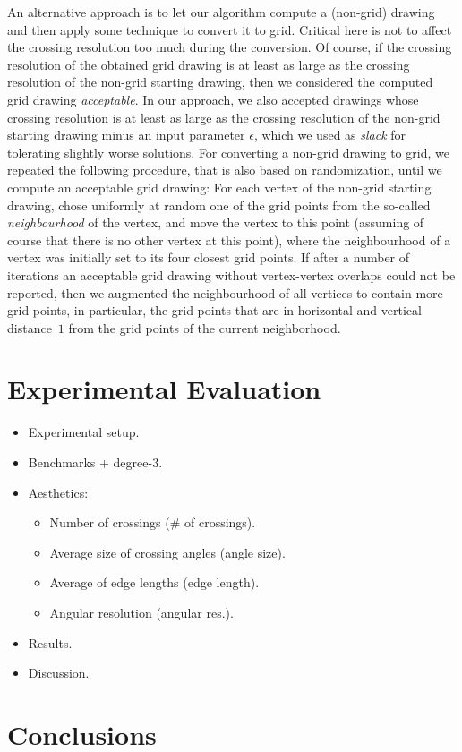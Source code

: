 \documentclass[runningheads]{llncs}
\begin{document}
An alternative approach is to let our algorithm compute a (non-grid) drawing and then apply some technique to convert it to grid. Critical here is not to affect the crossing resolution too much during the conversion. Of course, if the crossing resolution of the obtained grid drawing is at least as large as the crossing resolution of the non-grid starting drawing, then we considered the computed grid drawing \emph{acceptable}. In our approach, we also accepted drawings whose crossing resolution is at least as large as the crossing resolution of the non-grid starting drawing minus an input parameter $\epsilon$, which we used as \emph{slack} for tolerating slightly worse solutions. For converting a non-grid drawing to grid, we repeated the following procedure, that is also based on randomization, until we compute an acceptable grid drawing: For each vertex of the non-grid starting drawing, chose uniformly at random one of the grid points from the so-called \emph{neighbourhood} of the vertex, and move the vertex to this point (assuming of course that there is no other vertex at this point), where the neighbourhood of a vertex was initially set to its four closest grid points. If after a number of iterations an acceptable grid drawing without vertex-vertex overlaps could not be reported, then we augmented the neighbourhood of all vertices to contain more grid points, in particular, the grid points that are in horizontal and vertical distance~$1$ from the grid points of the current neighborhood. 


\section{Experimental Evaluation}
\label{sec:experiments}

\begin{itemize}
\item Experimental setup.
\item Benchmarks + degree-3.
\item Aesthetics:

\begin{itemize}
\item Number of crossings (\# of crossings).
\item Average size of crossing angles (angle size).
\item Average of edge lengths (edge length).
\item Angular resolution (angular res.).
\end{itemize}

\item Results.
\item Discussion.
\end{itemize}

\section{Conclusions}
\label{sec:conclusions}



\end{document}
